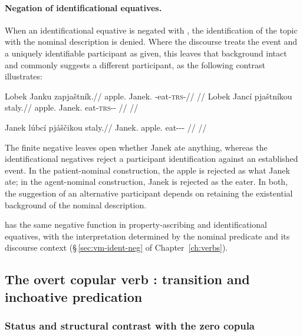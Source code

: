 \paragraph{Negation of identificational equatives.}
When an identificational equative is negated with , the identification
of the topic with the nominal description is denied. Where the discourse treats
the event and a uniquely identifiable participant as given, this
 leaves that background intact and commonly
suggests a different participant, as the following contrast illustrates:

\pex
\a
\begingl
\gla Lobek Janku zapjaštník.//
\glb apple.\Dir{} Janek.\Trs{} \Neg{}-eat-\textsc{trs}-\Pf{}//
\glft {} //
\endgl
\a
\begingl
\gla Lobek Jancí pjaštníkou staly.//
\glb apple.\Dir{} Janek.\Ind{} eat-\textsc{trs}-\Pf{}-\Nmlz{} \Neg{}//
\glft {} //
\endgl
\xe

\pex
\a
\begingl
\gla Janek lúbcí pjáščikou staly.//
\glb Janek.\Dir{} apple.\Ind{} eat-\Antip{}-\Pf{}-\Nmlz{} \Neg{}//
\glft {} //
\endgl
\xe

\noindent The finite negative  leaves open
whether Janek ate anything, whereas the identificational negatives reject a
participant identification against an established event. In the patient-nominal
construction, the apple is rejected as what Janek ate; in the agent-nominal
construction, Janek is rejected as the eater. In both, the suggestion of an
alternative participant depends on retaining the existential background of the
nominal description.

 has the same negative function in property-ascribing and
identificational equatives, with the interpretation determined by the nominal
predicate and its discourse context (§\,\ref{sec:vm-ident-neg} of
Chapter~\ref{ch:verbs}).

\subsection{The overt copular verb : transition and inchoative
predication}\label{sec:neh}

\subsubsection{Status and structural contrast with the zero copula}

